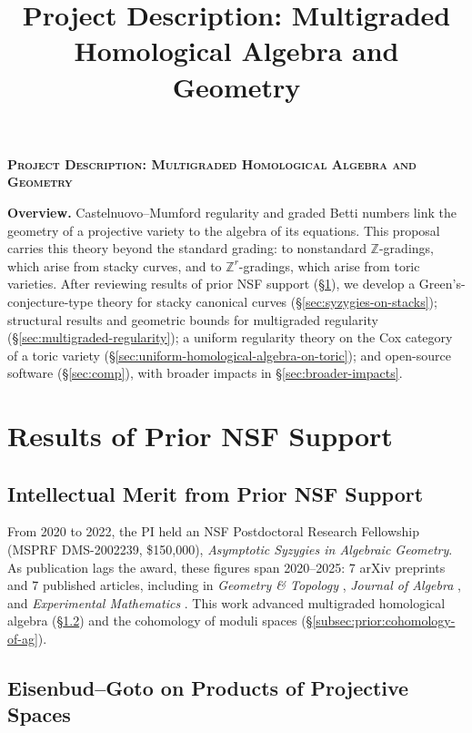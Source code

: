 \documentclass[11pt,reqno]{amsart}
\title{Project Description: Multigraded Homological Algebra and Geometry}
\theoremstyle{remark}
\newcommand{\ZZ}{\mathbb{Z}}
\begin{document}
\thispagestyle{empty}
\pagestyle{empty}
\begingroup
  \centering
  \large\scshape\bfseries Project Description: Multigraded Homological Algebra and Geometry\\[1em]
\endgroup

\setcounter{section}{0}

\noindent\textbf{Overview.} Castelnuovo--Mumford regularity and graded Betti numbers link the geometry of a projective variety to the algebra of its equations. This proposal carries this theory beyond the standard grading: to nonstandard $\ZZ$-gradings, which arise from stacky curves, and to $\ZZ^r$-gradings, which arise from toric varieties. After reviewing results of prior NSF support (\S\ref{sec:prior-work}), we develop a Green's-conjecture-type theory for stacky canonical curves (\S\ref{sec:syzygies-on-stacks}); structural results and geometric bounds for multigraded regularity (\S\ref{sec:multigraded-regularity}); a uniform regularity theory on the Cox category of a toric variety (\S\ref{sec:uniform-homological-algebra-on-toric}); and open-source software (\S\ref{sec:comp}), with broader impacts in \S\ref{sec:broader-impacts}.

\section{Results of Prior NSF Support}\label{sec:prior-work}

\subsection{Intellectual Merit from Prior NSF Support}

From 2020 to 2022, the PI held an NSF Postdoctoral Research Fellowship (MSPRF DMS-2002239, \$150,000), \textit{Asymptotic Syzygies in Algebraic Geometry}. As publication lags the award, these figures span 2020--2025: 7 arXiv preprints \cite{BCEGLY22,bruceHellerSayrafi26,bruceHellerSayrafi22,brandtBruceCorey23,BBCMMW24,ABBCV25,bruceHellerSayrafiSeceleanu25} and 7 published articles, including in \textit{Geometry \& Topology} \cite{BBCMMW24}, \textit{Journal of Algebra} \cite{BCEGLY22}, and \textit{Experimental Mathematics} \cite{BEGY20}. This work advanced multigraded homological algebra (\S\ref{subsec:prior:homological-algebra-on-toric}) and the cohomology of moduli spaces (\S\ref{subsec:prior:cohomology-of-ag}).

\subsection{Eisenbud--Goto on Products of Projective Spaces}\label{subsec:prior:homological-algebra-on-toric}
\end{document}
